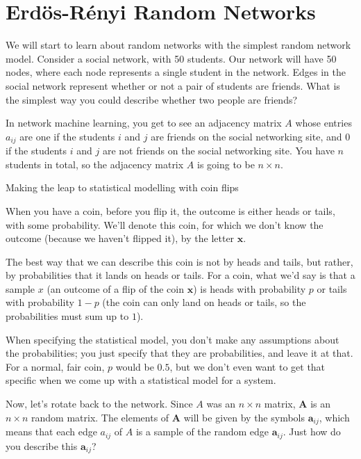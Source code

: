 \section{Erd\"os-R\'enyi Random Networks}
\label{sec:ch5:er}


We will start to learn about random networks with the simplest random network model. Consider a social network, with 50 students. Our network will have 50 nodes, where each node represents a single student in the network. Edges in the social network represent whether or not a pair of students are friends. What is the simplest way you could describe whether two people are friends?

In network machine learning, you get to see an adjacency matrix $A$ whose entries $a_{ij}$ are one if the students $i$ and $j$ are friends on the social networking site, and $0$ if the students $i$ and $j$ are not friends on the social networking site. You have $n$ students in total, so the adjacency matrix $A$ is going to be $n \times n$. 

\begin{floatingbox}[h]\caption{Making the leap to statistical modelling with coin flips}
When you have a coin, before you flip it, the outcome is either heads or tails, with some probability. We'll denote this coin, for which we don't know the outcome (because we haven't flipped it), by the letter $\mathbf x$. 

The best way that we can describe this coin is not by heads and tails, but rather, by {probabilities} that it lands on heads or tails. For a coin, what we'd say is that a sample $x$ (an outcome of a flip of the coin $\mathbf x$) is heads with probability $p$ or tails with probability $1-p$ (the coin can only land on heads or tails, so the probabilities must sum up to $1$). 

When specifying the statistical model, you don't make any assumptions about the probabilities; you just specify that they are probabilities, and leave it at that. For a normal, {fair} coin, $p$ would be $0.5$, but we don't even want to get that specific when we come up with a statistical model for a system.
\end{floatingbox}

Now, let's rotate back to the network. Since $A$ was an $n \times n$ matrix, $\mathbf A$ is an $n \times n$ random matrix. The elements of $\mathbf A$ will be given by the symbols $\mathbf a_{ij}$, which means that each edge $a_{ij}$ of $A$ is a sample of the random edge $\mathbf a_{ij}$. Just how do you describe this $\mathbf a_{ij}$? 

